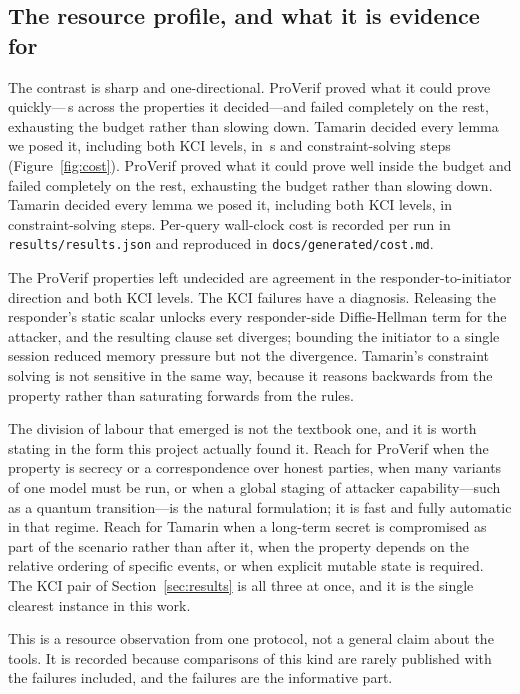 \subsection{The resource profile, and what it is evidence for}

The contrast is sharp and one-directional.
\ifwgtimings
ProVerif proved what it could prove quickly---\wgPvSpan\,s across the
properties it decided---and failed completely on the rest, exhausting the
budget rather than slowing down. Tamarin decided every lemma we posed it,
including both KCI levels, in \wgTamSpan\,s and \wgTamSteps{}
constraint-solving steps (Figure~\ref{fig:cost}).
\else
ProVerif proved what it could prove well inside the budget and failed
completely on the rest, exhausting the budget rather than slowing down.
Tamarin decided every lemma we posed it, including both KCI levels, in
\wgTamSteps{} constraint-solving steps. Per-query wall-clock cost is recorded
per run in \texttt{results/results.json} and reproduced in
\texttt{docs/generated/cost.md}.
\fi

 The \wgPvNonterm{} ProVerif properties left
undecided are agreement in the responder-to-initiator direction and both KCI
levels. The KCI failures have a diagnosis. Releasing the responder's static
scalar unlocks every responder-side Diffie-Hellman term for the attacker, and
the resulting clause set diverges; bounding the initiator to a single session
reduced memory pressure but not the divergence. Tamarin's constraint solving
is not sensitive in the same way, because it reasons backwards from the
property rather than saturating forwards from the rules.

 The division of labour that emerged is not the
textbook one, and it is worth stating in the form this project actually found
it. Reach for ProVerif when the property is secrecy or a correspondence over
honest parties, when many variants of one model must be run, or when a global
staging of attacker capability---such as a quantum transition---is the natural
formulation; it is fast and fully automatic in that regime. Reach for Tamarin
when a long-term secret is compromised as part of the scenario rather than
after it, when the property depends on the relative ordering of specific
events, or when explicit mutable state is required. The KCI pair of
Section~\ref{sec:results} is all three at once, and it is the single clearest
instance in this work.

 This is a resource observation from one protocol, not
a general claim about the tools. It is recorded because comparisons of this
kind are rarely published with the failures included, and the failures are the
informative part.


